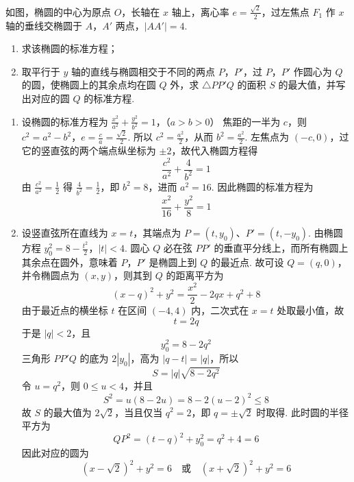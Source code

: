 \begin{problem}
如图，椭圆的中心为原点 \(O\)，长轴在 \(x\) 轴上，离心率 \(e = \frac{\sqrt{2}}{2}\)，过左焦点 \(F_{1}\) 作 \(x\) 轴的垂线交椭圆于 \(A\)，\(A'\) 两点，\(|AA'| = 4\).

\begin{enumerate}
\item 求该椭圆的标准方程；
\item 取平行于 \(y\) 轴的直线与椭圆相交于不同的两点 \(P\)，\(P'\)，过 \(P\)，\(P'\) 作圆心为 \(Q\) 的圆，使椭圆上的其余点均在圆 \(Q\) 外，求 \(\triangle PP'Q\) 的面积 \(S\) 的最大值，并写出对应的圆 \(Q\) 的标准方程.
\end{enumerate}

\begin{solution}
\begin{enumerate}
\item 设椭圆的标准方程为
\(\frac{x^2}{a^2}+\frac{y^2}{b^2}=1\)，（\(a>b>0\)）
焦距的一半为 \(c\)，则
\(c^2=a^2-b^2\)，\(e=\frac ca=\frac{\sqrt2}{2}\).
所以 \(c^2=\frac{a^2}{2}\)，从而 \(b^2=\frac{a^2}{2}\). 左焦点为 \((-c,0)\)，过它的竖直弦的两个端点纵坐标为 \(\pm2\)，故代入椭圆方程得
\[
\frac{c^2}{a^2}+\frac{4}{b^2}=1
\]
由 \(\frac{c^2}{a^2}=\frac{1}{2}\) 得 \(\frac{4}{b^2}=\frac{1}{2}\)，即 \(b^2=8\)，进而 \(a^2=16\). 因此椭圆的标准方程为
\[
\frac{x^2}{16}+\frac{y^2}{8}=1
\]
\item 设竖直弦所在直线为 \(x=t\)，其端点为 \(P=(t,y_0)\)、\(P'=(t,-y_0)\). 由椭圆方程
\(y_0^2=8-\frac{t^2}{2}\)，\(|t|<4\).
圆心 \(Q\) 必在弦 \(PP'\) 的垂直平分线上，而所有椭圆上其余点在圆外，意味着 \(P\)，\(P'\) 是椭圆上到 \(Q\) 的最近点. 故可设 \(Q=(q,0)\)，并令椭圆点为 \((x,y)\)，则其到 \(Q\) 的距离平方为
\[
(x-q)^2+y^2
=\frac{x^2}{2}-2qx+q^2+8
\]
由于最近点的横坐标 \(t\) 在区间 \((-4,4)\) 内，二次式在 \(x=t\) 处取最小值，故
\[
t=2q
\]
于是 \(|q|<2\)，且
\[
y_0^2=8-2q^2
\]
三角形 \(PP'Q\) 的底为 \(2|y_0|\)，高为 \(|q-t|=|q|\)，所以
\[
S=|q|\sqrt{8-2q^2}
\]
令 \(u=q^2\)，则 \(0\leqslant u<4\)，并且
\[
S^2=u(8-2u)=8-2(u-2)^2\leqslant8
\]
故 \(S\) 的最大值为 \(2\sqrt2\)，当且仅当 \(q^2=2\)，即 \(q=\pm\sqrt2\) 时取得. 此时圆的半径平方为
\[
QP^2=(t-q)^2+y_0^2=q^2+4=6
\]
因此对应的圆为
\[
(x-\sqrt2)^2+y^2=6
\quad\text{或}\quad
(x+\sqrt2)^2+y^2=6
\]
\end{enumerate}
\end{solution}
\end{problem}
